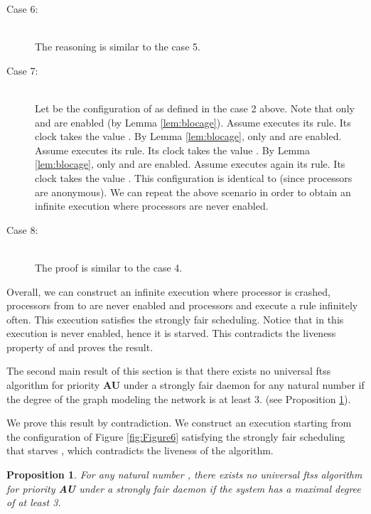 \documentclass[11pt,english,letterpaper]{article}
\newtheorem{proposition}{Proposition}
\newenvironment{proof}{{\noindent\bf Proof. } }{{\hfill }}
\begin{document}
\begin{proof}
\begin{description}
\item[Case 6:] \\
The reasoning is similar to the case 5.

\item[Case 7:] \\
Let  be the configuration of  as defined in the case 2 above. Note that only  and  are enabled (by Lemma \ref{lem:blocage}). Assume  executes its rule. Its clock takes the value  . By Lemma \ref{lem:blocage}, only  and  are enabled. Assume  executes its rule. Its clock takes the value . By Lemma \ref{lem:blocage}, only  and  are enabled. Assume  executes again its rule. Its clock takes the value . This configuration is identical to  (since processors are anonymous). We can repeat the above scenario in order to obtain an infinite execution where processors  are never enabled.

\item[Case 8:] \\
The proof is similar to the case 4.

\end{description}

Overall, we can construct an infinite execution where processor  is crashed, processors from  to  are never enabled and processors  and  execute a rule infinitely often. This execution satisfies the strongly fair scheduling. Notice that in this execution   is never enabled, hence it is starved. This contradicts the liveness property of  and proves the result.
\end{proof}

The second main result of this section is that there exists no universal ftss algorithm for priority \textbf{AU} under a strongly fair daemon for any natural number  if the degree of the graph modeling the network is at least 3. (see Proposition \ref{prop:impSFPri}).

We prove this result by contradiction. We construct an execution starting from the configuration  of Figure \ref{fig:Figure6} satisfying the  strongly fair scheduling that starves , which contradicts the liveness of the algorithm. 

\begin{proposition}\label{prop:impSFPri}
For any natural number , there exists no universal ftss algorithm for \emph{priority} \textbf{AU} under a strongly fair daemon if the system has a maximal degree of at least 3.
\end{proposition}
\end{document}
